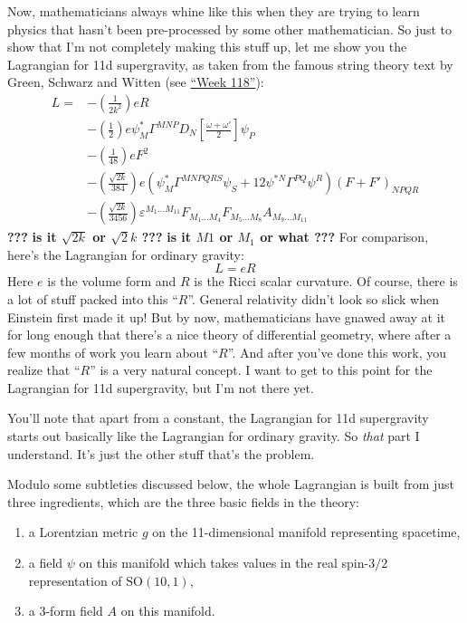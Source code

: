 \documentclass{article}
\begin{document}
Now, mathematicians always whine like this when they are trying to learn
physics that hasn't been pre-processed by some other mathematician. So
just to show that I'm not completely making this stuff up, let me show
you the Lagrangian for 11d supergravity, as taken from the famous string
theory text by Green, Schwarz and Witten (see
\protect\hyperlink{week118}{``Week 118''}): \[
  \begin{aligned}
    L =
    &- \left(\frac{1}{2k^2}\right) eR
  \\&- \left(\frac{1}{2}\right) e\psi_M^* \Gamma^{MNP} D_N\left[\frac{\omega+\omega'}{2}\right]\psi_P
  \\&- \left(\frac{1}{48}\right) eF^2
  \\&- \left(\frac{\sqrt{2k}}{384}\right) e(\psi_M^* \Gamma^{MNPQRS}\psi_S + 12\psi^{*N}\Gamma^{PQ}\psi^R)(F+F')_{NPQR}
  \\&- \left(\frac{\sqrt{2k}}{3456}\right) \varepsilon^{M_1\ldots M_{11}}F_{M_1\ldots M_4}F_{M_5\ldots M_8}A_{M_9\ldots M_{11}}
  \end{aligned}
\] \textbf{???} \textbf{is it \(\sqrt{2k}\) or \(\sqrt{2}k\) ???}
\textbf{is it \(M1\) or \(M_1\) or what ???} For comparison, here's the
Lagrangian for ordinary gravity: \[L = e R\] Here \(e\) is the volume
form and \(R\) is the Ricci scalar curvature. Of course, there is a lot
of stuff packed into this ``\(R\)''. General relativity didn't look so
slick when Einstein first made it up! But by now, mathematicians have
gnawed away at it for long enough that there's a nice theory of
differential geometry, where after a few months of work you learn about
``\(R\)''. And after you've done this work, you realize that ``\(R\)''
is a very natural concept. I want to get to this point for the
Lagrangian for 11d supergravity, but I'm not there yet.

You'll note that apart from a constant, the Lagrangian for 11d
supergravity starts out basically like the Lagrangian for ordinary
gravity. So \emph{that} part I understand. It's just the other stuff
that's the problem.

Modulo some subtleties discussed below, the whole Lagrangian is built
from just three ingredients, which are the three basic fields in the
theory:

\begin{enumerate}
\def\labelenumi{\Alph{enumi})}
\item
  a Lorentzian metric \(g\) on the 11-dimensional manifold representing
  spacetime,
\item
  a field \(\psi\) on this manifold which takes values in the real
  spin-\(3/2\) representation of \(\mathrm{SO}(10,1)\),
\item
  a 3-form field \(A\) on this manifold.
\end{enumerate}
\end{document}
